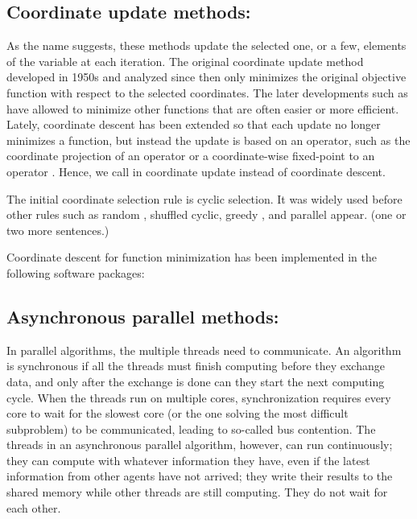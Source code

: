 \subsection*{Coordinate update methods:}
As the name suggests, these methods update the selected one, or a few, elements of the variable at each iteration. The original  coordinate update method \cite{Hildreth1957_quadratic,Warga1963_minimizing,SargentSebastian1973_convergence,LuoTseng1992_convergence} developed in 1950s and analyzed since then only minimizes the original objective function with respect to the selected coordinates. The later developments such as \cite{GrippoSciandrone2000_convergence,TsengYun2009_coordinate,TsengYun2009_blockcoordinate,XuYin2013_block,BolteSabachTeboulle2014_proximal} have allowed to minimize other functions that are often easier or more efficient. Lately, coordinate descent has been extended so that each update no longer minimizes a function, but instead the update is based on an operator, such as the coordinate projection of an operator or a coordinate-wise fixed-point to an operator \cite{CombettesPesquet2015_stochastic,BianchiHachemFranck2014_stochastic,PengXuYanYin2015_arock,PengWuXuYanYin2016_coordinate}. Hence, we call in coordinate update instead of coordinate descent. 

The initial coordinate selection rule  is cyclic selection. It was widely used before other rules such as random \cite{Nesterov2012_efficiency,RichtarikTakac2014_iteration,LuXiao2015_complexity}, shuffled cyclic, greedy \cite{BertsekasBertsekas1999_nonlinear,LiOsher2009_coordinate,TsengYun2009_coordinate,PengYanYin2013_parallel,NutiniSchmidtLaradjiFriedlanderKoepke2015_coordinate}, and parallel \cite{BradleyKyrolaBicksonGuestrin2011_parallel,RichtarikTakac2016_parallel} appear. (one or two more sentences.)

Coordinate descent for function minimization has been implemented in the following software packages: 

\subsection*{Asynchronous parallel methods:}  

In  parallel algorithms, the multiple threads need to communicate. An algorithm is synchronous if all the  threads must finish computing before they exchange data, and only after the exchange is done can they start the next computing cycle. When the threads run on multiple cores, synchronization requires every core to wait for the slowest core
(or the one solving the most difficult subproblem) to be communicated,  leading to so-called  bus contention. The threads in an asynchronous parallel algorithm, however, can run continuously; they can compute with whatever information they have, even if the latest information from other agents
have not arrived; they write their results to the shared memory while other threads are still computing. They do not wait for each other.

